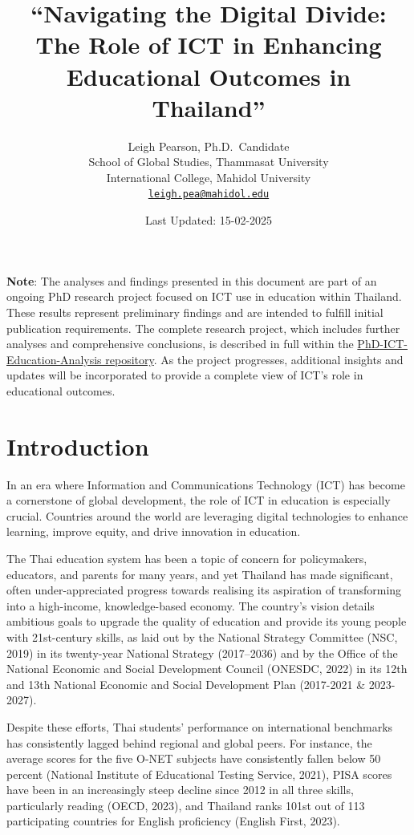 \documentclass[
]{article}
\title{``Navigating the Digital Divide: The Role of ICT in Enhancing
Educational Outcomes in Thailand''}
\author{Leigh Pearson, Ph.D.~Candidate\\
School of Global Studies, Thammasat University\\
International College, Mahidol University\\
\href{mailto:leigh.pea@mahidol.edu}{\nolinkurl{leigh.pea@mahidol.edu}}}
\date{Last Updated: 15-02-2025}
\begin{document}
\maketitle

\textbf{Note}: The analyses and findings presented in this document are
part of an ongoing PhD research project focused on ICT use in education
within Thailand. These results represent preliminary findings and are
intended to fulfill initial publication requirements. The complete
research project, which includes further analyses and comprehensive
conclusions, is described in full within the
\href{https://github.com/justleigh/PhD-ICT-Education-Analysis}{PhD-ICT-Education-Analysis
repository}. As the project progresses, additional insights and updates
will be incorporated to provide a complete view of ICT's role in
educational outcomes.


\newpage
\tableofcontents

\newpage

\hypertarget{introduction}{%
\section{Introduction}\label{introduction}}

In an era where Information and Communications Technology (ICT) has
become a cornerstone of global development, the role of ICT in education
is especially crucial. Countries around the world are leveraging digital
technologies to enhance learning, improve equity, and drive innovation
in education.

The Thai education system has been a topic of concern for policymakers,
educators, and parents for many years, and yet Thailand has made
significant, often under-appreciated progress towards realising its
aspiration of transforming into a high-income, knowledge-based economy.
The country's vision details ambitious goals to upgrade the quality of
education and provide its young people with 21st-century skills, as laid
out by the National Strategy Committee (NSC, 2019) in its twenty-year
National Strategy (2017--2036) and by the Office of the National
Economic and Social Development Council (ONESDC, 2022) in its 12th and
13th National Economic and Social Development Plan (2017-2021 \&
2023-2027).

Despite these efforts, Thai students' performance on international
benchmarks has consistently lagged behind regional and global peers. For
instance, the average scores for the five O-NET subjects have
consistently fallen below 50 percent (National Institute of Educational
Testing Service, 2021), PISA scores have been in an increasingly steep
decline since 2012 in all three skills, particularly reading (OECD,
2023), and Thailand ranks 101st out of 113 participating countries for
English proficiency (English First, 2023).
\end{document}
